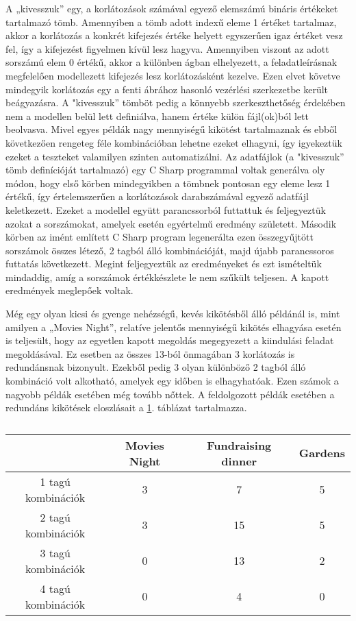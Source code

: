 \documentclass[12pt,a4paper,twoside, openright]{report}
\begin{document}
    A „kivesszuk” egy, a korlátozások számával egyező elemszámú bináris értékeket tartalmazó tömb.
    Amennyiben a tömb adott indexű eleme 1 értéket tartalmaz, akkor a korlátozás a konkrét kifejezés értéke helyett egyszerűen igaz értéket vesz fel, így a kifejezést figyelmen kívül lesz hagyva.
    Amennyiben viszont az adott sorszámú elem 0 értékű, akkor a különben ágban elhelyezett, a feladatleírásnak megfelelően modellezett kifejezés lesz korlátozásként kezelve.
    Ezen elvet követve mindegyik korlátozás egy a fenti ábrához hasonló vezérlési szerkezetbe került beágyazásra.
    A "kivesszuk” tömböt pedig a könnyebb szerkeszthetőség érdekében nem a modellen belül lett definiálva, hanem értéke külön fájl(ok)ból lett beolvasva.
    Mivel egyes példák nagy mennyiségű kikötést tartalmaznak és ebből következően rengeteg féle kombinációban lehetne ezeket elhagyni, így igyekeztük ezeket a teszteket valamilyen szinten automatizálni.
    Az adatfájlok (a "kivesszuk” tömb definícióját tartalmazó) egy C Sharp programmal voltak generálva oly módon, hogy első körben mindegyikben a tömbnek pontosan egy eleme lesz 1 értékű, így értelemszerűen a korlátozások darabszámával egyező adatfájl keletkezett.
    Ezeket a modellel együtt parancssorból futtattuk és feljegyeztük azokat a sorszámokat, amelyek esetén egyértelmű eredmény született.
    Második körben az imént említett C Sharp program legenerálta ezen összegyűjtött sorszámok összes létező, 2 tagból álló kombinációját, majd újabb parancssoros futtatás következett.
    Megint feljegyeztük az eredményeket és ezt ismételtük mindaddig, amíg a sorszámok értékkészlete le nem szűkült teljesen.
    A kapott eredmények meglepőek voltak.
    
    Még egy olyan kicsi és gyenge nehézségű, kevés kikötésből álló példánál is, mint amilyen a „Movies Night”, relatíve jelentős mennyiségű kikötés elhagyása esetén is teljesült, hogy az egyetlen kapott megoldás megegyezett a kiindulási feladat megoldásával.
    Ez esetben az összes 13-ból önmagában 3 korlátozás is redundánsnak bizonyult.
    Ezekből pedig 3 olyan különböző 2 tagból álló kombináció volt alkotható, amelyek egy időben is elhagyhatóak.
    Ezen számok a nagyobb példák esetében még tovább nőttek.
    A feldolgozott példák esetében a redundáns kikötések eloszlásait a \ref{elhagyhato}. táblázat tartalmazza.

    
    \begin{table}[h]
    	\centering
    	\caption{}
    	\label{elhagyhato}   
    	\begin{tabular}{|c|c|c|c|}
    		\hline 
    		& Movies Night & Fundraising dinner & Gardens \\ 
    		\hline 
    		1 tagú kombinációk & 3 & 7 & 5 \\ 
    		\hline 
    		2 tagú kombinációk & 3 & 15 & 5 \\ 
    		\hline 
    		3 tagú kombinációk & 0 & 13 & 2 \\ 
    		\hline 
    		4 tagú kombinációk & 0 & 4 & 0 \\ 
    		\hline 
    	\end{tabular} 
    \end{table}
    
\end{document}
